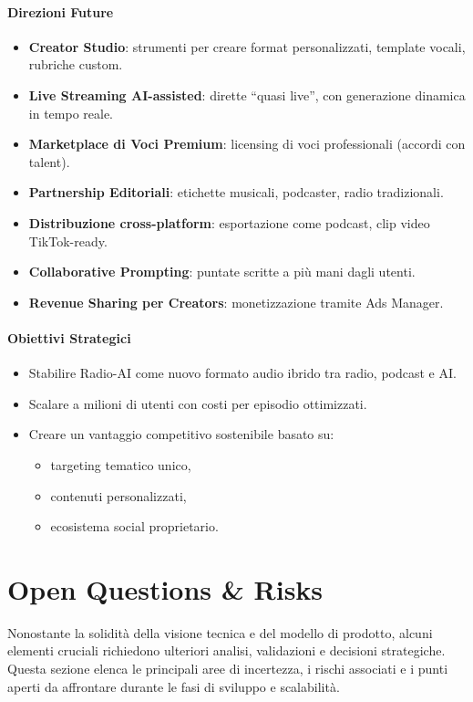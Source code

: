 \documentclass[11pt,a4paper]{article}
\begin{document}
\paragraph{Direzioni Future}
\begin{itemize}
    \item \textbf{Creator Studio}: strumenti per creare format personalizzati, template vocali, rubriche custom.
    \item \textbf{Live Streaming AI-assisted}: dirette “quasi live”, con generazione dinamica in tempo reale.
    \item \textbf{Marketplace di Voci Premium}: licensing di voci professionali (accordi con talent).
    \item \textbf{Partnership Editoriali}: etichette musicali, podcaster, radio tradizionali.
    \item \textbf{Distribuzione cross-platform}: esportazione come podcast, clip video TikTok-ready.
    \item \textbf{Collaborative Prompting}: puntate scritte a più mani dagli utenti.
    \item \textbf{Revenue Sharing per Creators}: monetizzazione tramite Ads Manager.
\end{itemize}

\paragraph{Obiettivi Strategici}
\begin{itemize}
    \item Stabilire Radio-AI come nuovo formato audio ibrido tra radio, podcast e AI.
    \item Scalare a milioni di utenti con costi per episodio ottimizzati.
    \item Creare un vantaggio competitivo sostenibile basato su:
    \begin{itemize}
        \item targeting tematico unico,
        \item contenuti personalizzati,
        \item ecosistema social proprietario.
    \end{itemize}
\end{itemize}
\section{Open Questions \& Risks}

Nonostante la solidità della visione tecnica e del modello di prodotto, alcuni elementi cruciali richiedono ulteriori analisi, validazioni e decisioni strategiche.  
Questa sezione elenca le principali aree di incertezza, i rischi associati e i punti aperti da affrontare durante le fasi di sviluppo e scalabilità.
\end{document}
